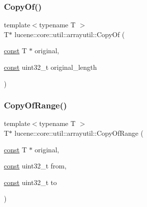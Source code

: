 \mbox{\label{namespacelucene_1_1core_1_1util_1_1arrayutil_a5a4d6233afed538be3d004f5bd14375b}} 
\subsubsection{\texorpdfstring{Copy\+Of()}{CopyOf()}\hspace{0.1cm}{\footnotesize\ttfamily [2/2]}}
{\footnotesize\ttfamily template$<$typename T $>$ \\
T$\ast$ lucene\+::core\+::util\+::arrayutil\+::\+Copy\+Of (\begin{DoxyParamCaption}\item[{\mbox{\hyperlink{ZlibCrc32_8h_a2c212835823e3c54a8ab6d95c652660e}{const}} T $\ast$}]{original,  }\item[{\mbox{\hyperlink{ZlibCrc32_8h_a2c212835823e3c54a8ab6d95c652660e}{const}} uint32\+\_\+t}]{original\+\_\+length }\end{DoxyParamCaption})}

\mbox{\label{namespacelucene_1_1core_1_1util_1_1arrayutil_a107a721d94f4e31167dc49e3b07ac859}} 
\subsubsection{\texorpdfstring{Copy\+Of\+Range()}{CopyOfRange()}}
{\footnotesize\ttfamily template$<$typename T $>$ \\
T$\ast$ lucene\+::core\+::util\+::arrayutil\+::\+Copy\+Of\+Range (\begin{DoxyParamCaption}\item[{\mbox{\hyperlink{ZlibCrc32_8h_a2c212835823e3c54a8ab6d95c652660e}{const}} T $\ast$}]{original,  }\item[{\mbox{\hyperlink{ZlibCrc32_8h_a2c212835823e3c54a8ab6d95c652660e}{const}} uint32\+\_\+t}]{from,  }\item[{\mbox{\hyperlink{ZlibCrc32_8h_a2c212835823e3c54a8ab6d95c652660e}{const}} uint32\+\_\+t}]{to }\end{DoxyParamCaption})}


